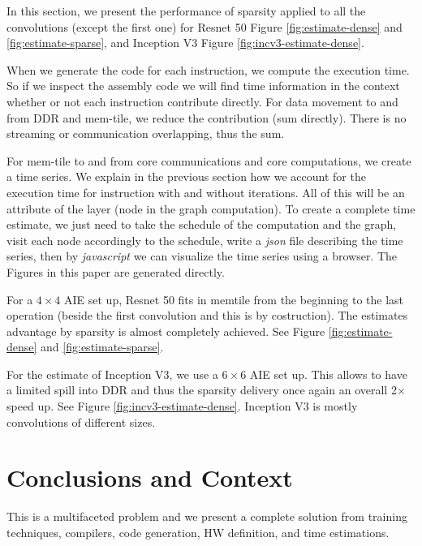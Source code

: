 \documentclass[sigconf]{acmart}
\begin{document}
In this section, we present the performance of sparsity applied to all
the convolutions (except the first one) for Resnet 50 Figure
\ref{fig:estimate-dense} and \ref{fig:estimate-sparse}, and Inception
V3 Figure \ref{fig:incv3-estimate-dense}.


When we generate the code for each instruction, we compute the
execution time. So if we inspect the assembly code we will find time
information in the context whether or not each instruction contribute
directly. For data movement to and from DDR and mem-tile, we reduce
the contribution (sum directly). There is no streaming or
communication overlapping, thus the sum.

For mem-tile to and from core communications and core computations, we
create a time series. We explain in the previous section how we
account for the execution time for instruction with and without
iterations. All of this will be an attribute of the layer (node in the
graph computation).  To create a complete time estimate, we just need
to take the schedule of the computation and the graph, visit each node
accordingly to the schedule, write a {\em json} file describing the
time series, then by {\em javascript} we can visualize the time series
using a browser. The Figures in this paper are generated directly.

For a $4\times 4$ AIE set up, Resnet 50 fits in memtile from the
beginning to the last operation (beside the first convolution and this
is by costruction). The estimates advantage by sparsity is almost
completely achieved.  See Figure \ref{fig:estimate-dense} and
\ref{fig:estimate-sparse}.

For the estimate of Inception V3, we use a $6\times 6$ AIE set up.
This allows to have a limited spill into DDR and thus the sparsity
delivery once again an overall 2$\times$ speed up. See Figure
\ref{fig:incv3-estimate-dense}. Inception V3 is mostly convolutions of
different sizes.







\section{Conclusions and Context}
This is a multifaceted problem and we present a complete solution from
training techniques, compilers, code generation, HW definition, and
time estimations.
\end{document}
